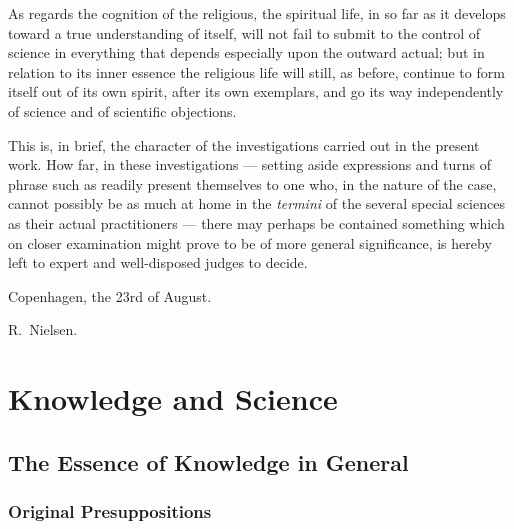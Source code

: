 \documentclass[12pt]{book}
\begin{document}
As regards the cognition of the religious, the spiritual life, in so far as
it develops toward a true understanding of itself, will not fail to submit
to the control of science in everything that depends especially upon the
outward actual; but in relation to its inner essence the religious life
will still, as before, continue to form itself out of its own spirit, after
its own exemplars, and go its way independently of science and of
scientific objections.

This is, in brief, the character of the investigations carried out in the
present work. How far, in these investigations --- setting aside
expressions and turns of phrase such as readily present themselves to one
who, in the nature of the case, cannot possibly be as much at home in the
\textit{termini} of the several special sciences as their actual
practitioners --- there may perhaps be contained something which on closer
examination might prove to be of more general significance, is hereby left
to expert and well-disposed judges to decide.

\bigskip
\noindent Copenhagen, the 23rd of August.
\nopagebreak
\par\hfill R.\ Nielsen.


\part{Knowledge and Science}

\chapter{The Essence of Knowledge in General}

\section{Original Presuppositions}
\label{sec:1}
\end{document}
